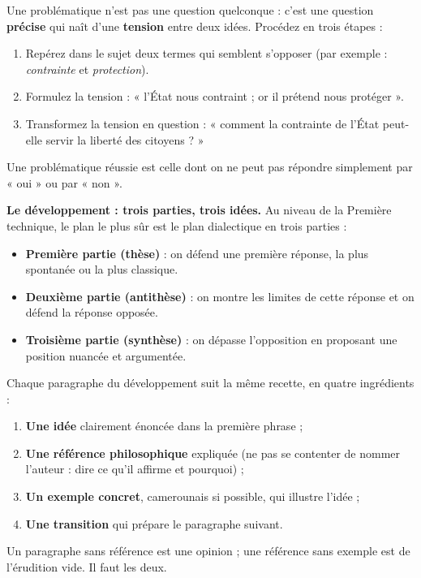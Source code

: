 \documentclass[11pt]{article}
\begin{document}
\begin{methode}
Une problématique n'est pas une question quelconque : c'est une question \textbf{précise} qui naît d'une \textbf{tension} entre deux idées. Procédez en trois étapes :
\begin{enumerate}
\item Repérez dans le sujet deux termes qui semblent s'opposer (par exemple : \emph{contrainte} et \emph{protection}).
\item Formulez la tension : « l'État nous contraint ; or il prétend nous protéger ».
\item Transformez la tension en question : « comment la contrainte de l'État peut-elle servir la liberté des citoyens ? »
\end{enumerate}
Une problématique réussie est celle dont on ne peut pas répondre simplement par « oui » ou par « non ».
\end{methode}

\textbf{Le développement : trois parties, trois idées.} Au niveau de la Première technique, le plan le plus sûr est le plan dialectique en trois parties :

\begin{itemize}
\item \textbf{Première partie (thèse)} : on défend une première réponse, la plus spontanée ou la plus classique.
\item \textbf{Deuxième partie (antithèse)} : on montre les limites de cette réponse et on défend la réponse opposée.
\item \textbf{Troisième partie (synthèse)} : on dépasse l'opposition en proposant une position nuancée et argumentée.
\end{itemize}

\begin{methode}
Chaque paragraphe du développement suit la même recette, en quatre ingrédients :
\begin{enumerate}
\item \textbf{Une idée} clairement énoncée dans la première phrase ;
\item \textbf{Une référence philosophique} expliquée (ne pas se contenter de nommer l'auteur : dire ce qu'il affirme et pourquoi) ;
\item \textbf{Un exemple concret}, camerounais si possible, qui illustre l'idée ;
\item \textbf{Une transition} qui prépare le paragraphe suivant.
\end{enumerate}
Un paragraphe sans référence est une opinion ; une référence sans exemple est de l'érudition vide. Il faut les deux.
\end{methode}
\end{document}
